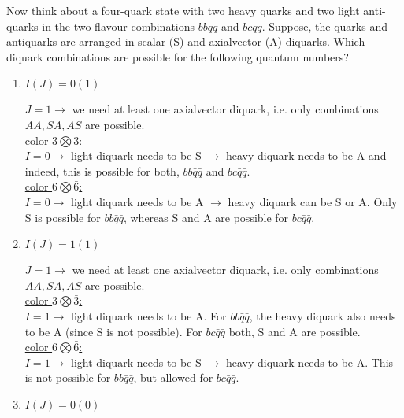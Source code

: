 

Now think about a four-quark state with two heavy quarks and two light anti-quarks in the two 
flavour combinations $bb\bar{q}\bar{q}$ and $bc\bar{q}\bar{q}$. Suppose, the quarks and antiquarks are 
arranged in scalar (S) and axialvector (A) diquarks. Which diquark combinations are possible for the following quantum numbers?

\begin{enumerate}
	\item $I(J) = 0(1)$
	      
	      \begin{solution}
		      $J=1 \rightarrow$ we need at least one axialvector diquark, i.e. only combinations $AA, SA, AS$ are possible.\\ 
		      \underline{color $3 \bigotimes \bar{3}$:}\\
		      $I=0 \rightarrow$ light diquark needs to be S $\rightarrow$ heavy diquark needs to be A and indeed, this is possible for
		      both, $bb\bar{q}\bar{q}$ and $bc\bar{q}\bar{q}$.\\
		      \underline{color $6 \bigotimes \bar{6}$:}\\
		      $I=0 \rightarrow$ light diquark needs to be A $\rightarrow$ heavy diquark can be S or A. Only S is possible for $bb\bar{q}\bar{q}$, whereas S and A are possible for $bc\bar{q}\bar{q}$. 	
	      \end{solution}
	      
	\item $I(J) = 1(1)$
	      
	      \begin{solution}
		      $J=1 \rightarrow$ we need at least one axialvector diquark, i.e. only combinations $AA, SA, AS$ are possible.\\ 
		      \underline{color $3 \bigotimes \bar{3}$:}\\
		      $I=1 \rightarrow$ light diquark needs to be A. For $bb\bar{q}\bar{q}$, the heavy diquark also needs to be A 
		      (since S is not possible). For $bc\bar{q}\bar{q}$ both,
		      S and A are possible.\\
		      \underline{color $6 \bigotimes \bar{6}$:}\\
		      $I=1 \rightarrow$ light diquark needs to be S $\rightarrow$ heavy diquark needs to be A. This is not possible for
		      $bb\bar{q}\bar{q}$, but allowed for $bc\bar{q}\bar{q}$.		
	      \end{solution}
	      
	\item $I(J) = 0(0)$
	      

\end{enumerate}
